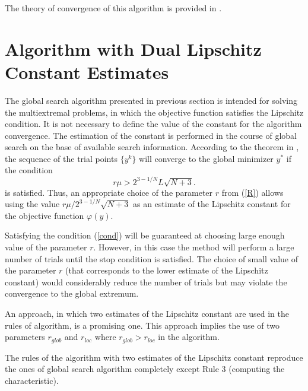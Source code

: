 \documentclass[runningheads]{llncs}
\begin{document}
The theory of convergence of this algorithm is provided in \cite{Strongin2000}.


\section{Algorithm with Dual Lipschitz Constant Estimates}

The global search algorithm presented in previous section is intended for solving the multiextremal problems, in which the objective function satisfies the Lipschitz condition. It is not necessary to define the value of the constant for the algorithm convergence. The estimation of the constant is performed in the course of global search on the base of available search information. 
According to the theorem in \cite{Strongin2000}, the sequence of the trial points $\{y^k\}$ will converge to the global minimizer $y^*$ if the condition 
\begin{equation}\label{cond}
r\mu > 2^{3-1/N}L\sqrt{N+3}.
\end{equation}
\noindent is satisfied. Thus,  an appropriate choice of the parameter $r$ from (\ref{R}) allows using the value $r\mu / 2^{3-1/N}\sqrt{N+3}$ as an estimate of the Lipschitz constant for the objective function $\varphi(y)$.

Satisfying the condition (\ref{cond}) will be guaranteed at choosing large enough value of the parameter $r$. However, in this case the method will perform a large number of trials until the stop condition is satisfied.
The choice of small value of the parameter $r$ (that corresponds to the lower estimate of the Lipschitz constant) would considerably reduce the number of trials but may violate the convergence to the global extremum.

An approach, in which two estimates of the Lipschitz constant %
are used in the rules of algorithm, is a promising one. 
This approach implies the use of two parameters $r_{glob}$ and $r_{loc}$ where $r_{glob} > r_{loc}$ in the algorithm.

The rules of the algorithm with two estimates of the Lipschitz constant reproduce the ones of global search algorithm completely except Rule 3 (computing the characteristic).
\end{document}
